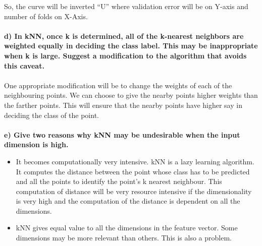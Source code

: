 \documentclass[11pt,letterpaper]{article}
\begin{document}
So, the curve will be inverted “U” where validation error will be on Y-axis and number of folds on X-Axis.\\\\

\textbf{d) In kNN, once k is determined, all of the k-nearest neighbors are weighted equally in deciding the class label. This may be inappropriate when k is large. Suggest a modification to the algorithm that avoids this caveat.}\\\\
One appropriate modification will be to change the weights of each of the neighbouring points. We can choose to give the nearby points higher weights than the farther points. This will ensure that the nearby points have higher say in deciding the class of the point.\\\\

\textbf{e) Give two reasons why kNN may be undesirable when the input dimension is high.}
\begin{itemize}
	\item It becomes computationally very intensive. kNN is a lazy learning algorithm. It computes the distance between the point whose class has to be predicted and all the points to identify the point’s k nearest neighbour. This computation of distance will be very resource intensive if the dimensionality is very high and the computation of the distance is dependent on all the dimensions.
	\item kNN gives equal value to all the dimensions in the feature vector. Some dimensions may be more relevant than others. This is also a problem.

\end{itemize}


\end{document}
